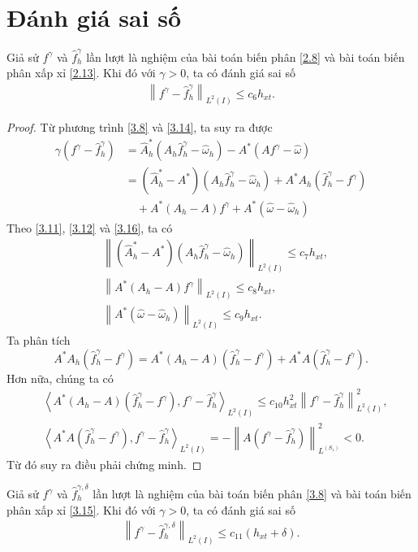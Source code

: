 \documentclass[]{article}
\begin{document}
\section{Đánh giá sai số}
\begin{dl}\label{dl3.3}
	Giả sử $f^\gamma$ và $\hat{f}^\gamma_h$ lần lượt là nghiệm của bài toán biến phân \eqref{2.8} và bài toán biến phân xấp xỉ \eqref{2.13}. Khi đó với $\gamma>0$, ta có đánh giá sai số
	\begin{align}\label{3.17}
	\left\|f^\gamma-\hat{f}^\gamma_h \right\|_{L^2(I)}\leq c_6h_{xt}.
	\end{align}
\end{dl}
\begin{proof} Từ phương trình \eqref{3.8} và \eqref{3.14}, ta suy ra được
	\begin{align*}
		\gamma \left(f^\gamma-\hat{f}^\gamma_h\right)&=\hat{A}^*_h\left(A_h\hat{f}^\gamma_h-\hat{\omega}_h\right)-A^*\left(Af^\gamma-\hat{\omega}\right)\\
		&=\left(\hat{A}^*_h-A^*\right)\left(A_h\hat{f}^\gamma_h-\hat{\omega}_h\right)+A^*A_h\left(\hat{f}^\gamma_h-f^\gamma\right)\\
		&\quad+A^*\left(A_h-A\right)f^\gamma+A^*\left(\hat{\omega}-\hat{\omega}_h\right)
	\end{align*}
	Theo \eqref{3.11}, \eqref{3.12} và \eqref{3.16}, ta có
	\begin{align*}
		&\left\| \left(\hat{A}^*_h-A^*\right)\left(A_h\hat{f}^\gamma_h-\hat{\omega}_h\right)\right\|_{L^2(I)}\leq c_7h_{xt},\\
		&\left\| A^*\left(A_h-A\right)f^\gamma\right\|_{L^2(I)}\leq c_8h_{xt},\\
		&\left\|A^*\left(\hat{\omega}-\hat{\omega}_h\right) \right\|_{L^2(I)}\leq c_9h_{xt}.
	\end{align*}
	Ta phân tích
	$$A^*A_h\left(\hat{f}^\gamma_h-f^\gamma\right)=A^*\left(A_h-A\right)\left(\hat{f}^\gamma_h-f^\gamma\right)+A^*A\left(\hat{f}^\gamma_h-f^\gamma\right).$$
	Hơn nữa, chúng ta có
	\begin{align*}
		&\left\langle A^*\left(A_h-A\right)\left(\hat{f}^\gamma_h-f^\gamma\right), f^\gamma-\hat{f}^\gamma_h\right\rangle_{L^2(I)}\leq c_{10}h_{xt}^2\left\| f^\gamma-\hat{f}^\gamma_h\right\|^2_{L^2(I)},\\
		&\left\langle A^*A\left(\hat{f}^\gamma_h-f^\gamma\right), f^\gamma-\hat{f}^\gamma_h\right\rangle_{L^2(I)}=-\left\|A\left(f^\gamma-\hat{f}^\gamma_h\right) \right\|^2_{L^(S_1)}<0.
	\end{align*}
	Từ đó suy ra điều phải chứng minh.
\end{proof}
\begin{cy}\label{cy3.1}
	Giả sử $f^\gamma$ và $\hat{f}^{\gamma, \delta}_h$ lần lượt là nghiệm của bài toán biến phân \eqref{3.8} và bài toán biến phân xấp xỉ \eqref{3.15}. Khi đó với $\gamma>0$, ta có đánh giá sai số
	\begin{align}\label{3.18}
	\left\|f^\gamma-\hat{f}^{\gamma, \delta}_h \right\|_{L^2(I)}\leq c_{11}(h_{xt}+\delta).
	\end{align}
\end{cy}
\end{document}
